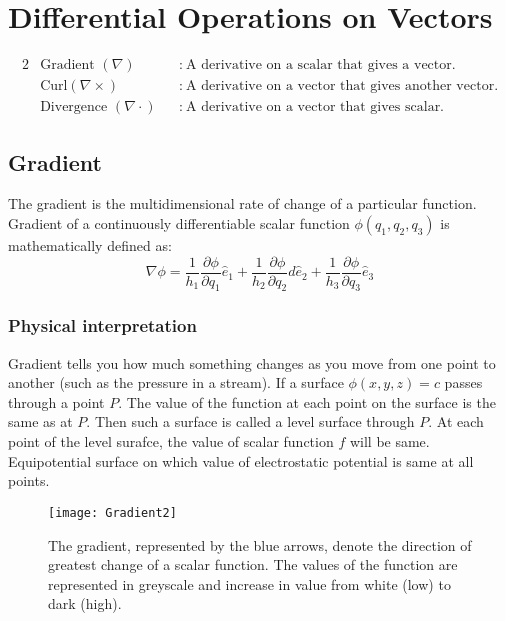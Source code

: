 \section{Differential Operations on Vectors}
\begin{alignat*}{2}
&\text{Gradient }(\nabla)&&\textbf{:}\ \text{A derivative on a scalar that gives a vector.}
\\&\text{Curl} (\nabla \times)&&\textbf{:}\ \text{A derivative on a vector that gives another vector.}
\\&\text{Divergence }(\nabla \cdot)&&\textbf{:}\ \text{A derivative on a vector that gives scalar.}
\end{alignat*}
 
\subsection{Gradient}
 The gradient is the multidimensional rate of change of a particular function.
Gradient of a continuously differentiable scalar function $\phi(q_{1}, q_{2}, q_{3})$ is mathematically defined as:
$$ \nabla \phi=\frac{1}{h_{1}}\frac{\partial \phi}{\partial q_{1}} \hat e_{1}+\frac{1}{h_{2}}\frac{\partial \phi}{\partial q_{2}} d \hat e_{2}+\frac{1}{h_{3}}\frac{\partial \phi}{\partial q_{3}} \hat e_{3}
$$
\subsubsection{Physical interpretation}
	Gradient tells you how much something changes as you move from one point to another (such as the pressure in a stream). If a surface $\phi(x, y, z)=c$ passes through a point $P$. The value of the function at each point on the surface is the same as at $P$. Then such a surface is called a level surface through $P$. At each point of the level surafce, the value of scalar function $f$ will be same. Equipotential surface on which value of electrostatic potential is same at all points.


	\begin{figure}[H]
		\texttt{[image: Gradient2]}
		\caption{The gradient, represented by the blue arrows, denote the direction of greatest change of a scalar function. The values of the function are represented in greyscale and increase in value from white (low) to dark (high).}
	\end{figure}




